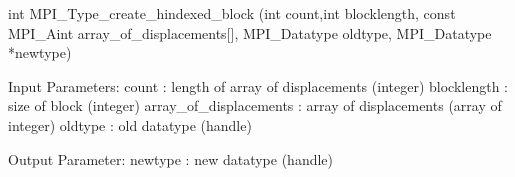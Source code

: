 int MPI_Type_create_hindexed_block
   (int count,int blocklength,
    const MPI_Aint array_of_displacements[],
    MPI_Datatype oldtype, MPI_Datatype *newtype)

Input Parameters:
count : length of array of displacements (integer)
blocklength : size of block (integer)
array_of_displacements : array of displacements (array of integer)
oldtype : old datatype (handle)

Output Parameter:
newtype : new datatype (handle)
